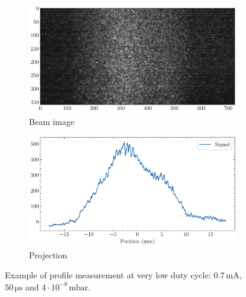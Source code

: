 \begin{figure}[!ht]
  \centering  
  \begin{subfigure}[t]{1\textwidth}
    \includegraphics[width=\textwidth]{04_IPHI_Test/figures/fig000_limits_IPHI_a}
    \caption{Beam image}
    \label{chap4:limits_IPHI_a}
  \end{subfigure}

  \begin{subfigure}[t]{1\textwidth}
    \includegraphics[width=\textwidth]{04_IPHI_Test/figures/fig000_limits_IPHI_b}
    \caption{Projection}
    \label{chap4:limits_IPHI_b}
  \end{subfigure}
  \caption[Example of profile measurement at very low duty cycle.]{Example of profile measurement at very low duty cycle: $0.7\,\mathrm{mA}$, $50\, \mathrm{\mu s}$ and $4 \cdot 10^{-8}\,\mathrm{mbar}$.}
  \label{chap4:limits_IPHI}
\end{figure}
